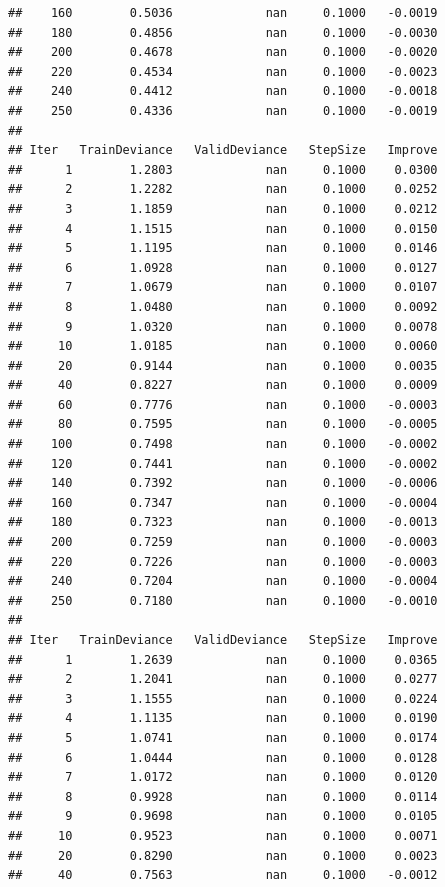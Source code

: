 \documentclass[]{book}
\begin{document}
\begin{verbatim}
##    160        0.5036             nan     0.1000   -0.0019
##    180        0.4856             nan     0.1000   -0.0030
##    200        0.4678             nan     0.1000   -0.0020
##    220        0.4534             nan     0.1000   -0.0023
##    240        0.4412             nan     0.1000   -0.0018
##    250        0.4336             nan     0.1000   -0.0019
## 
## Iter   TrainDeviance   ValidDeviance   StepSize   Improve
##      1        1.2803             nan     0.1000    0.0300
##      2        1.2282             nan     0.1000    0.0252
##      3        1.1859             nan     0.1000    0.0212
##      4        1.1515             nan     0.1000    0.0150
##      5        1.1195             nan     0.1000    0.0146
##      6        1.0928             nan     0.1000    0.0127
##      7        1.0679             nan     0.1000    0.0107
##      8        1.0480             nan     0.1000    0.0092
##      9        1.0320             nan     0.1000    0.0078
##     10        1.0185             nan     0.1000    0.0060
##     20        0.9144             nan     0.1000    0.0035
##     40        0.8227             nan     0.1000    0.0009
##     60        0.7776             nan     0.1000   -0.0003
##     80        0.7595             nan     0.1000   -0.0005
##    100        0.7498             nan     0.1000   -0.0002
##    120        0.7441             nan     0.1000   -0.0002
##    140        0.7392             nan     0.1000   -0.0006
##    160        0.7347             nan     0.1000   -0.0004
##    180        0.7323             nan     0.1000   -0.0013
##    200        0.7259             nan     0.1000   -0.0003
##    220        0.7226             nan     0.1000   -0.0003
##    240        0.7204             nan     0.1000   -0.0004
##    250        0.7180             nan     0.1000   -0.0010
## 
## Iter   TrainDeviance   ValidDeviance   StepSize   Improve
##      1        1.2639             nan     0.1000    0.0365
##      2        1.2041             nan     0.1000    0.0277
##      3        1.1555             nan     0.1000    0.0224
##      4        1.1135             nan     0.1000    0.0190
##      5        1.0741             nan     0.1000    0.0174
##      6        1.0444             nan     0.1000    0.0128
##      7        1.0172             nan     0.1000    0.0120
##      8        0.9928             nan     0.1000    0.0114
##      9        0.9698             nan     0.1000    0.0105
##     10        0.9523             nan     0.1000    0.0071
##     20        0.8290             nan     0.1000    0.0023
##     40        0.7563             nan     0.1000   -0.0012

\end{verbatim}
\end{document}
